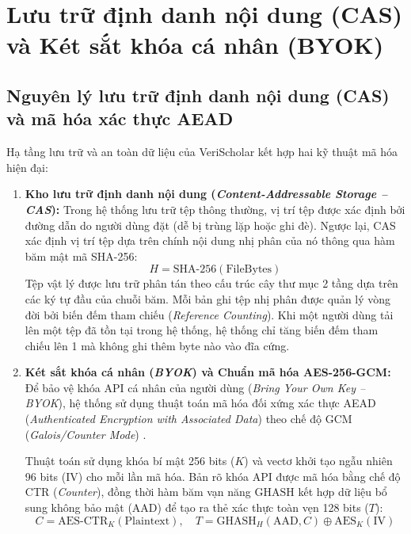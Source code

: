 \section{Lưu trữ định danh nội dung (CAS) và Két sắt khóa cá nhân (BYOK)}
\label{sec:cas_byok}

\subsection{Nguyên lý lưu trữ định danh nội dung (CAS) và mã hóa xác thực AEAD}
\label{subsec:nguyen_ly_cas_byok}
Hạ tầng lưu trữ và an toàn dữ liệu của VeriScholar kết hợp hai kỹ thuật mã hóa hiện đại:

\begin{enumerate}[label=\textbf{(\arabic*)}]
    \item \textbf{Kho lưu trữ định danh nội dung (\textit{Content-Addressable Storage -- CAS}):}
    Trong hệ thống lưu trữ tệp thông thường, vị trí tệp được xác định bởi đường dẫn do người dùng đặt (dễ bị trùng lặp hoặc ghi đè). Ngược lại, CAS xác định vị trí tệp dựa trên chính nội dung nhị phân của nó thông qua hàm băm mật mã SHA-256:
    \begin{equation}
    \label{eq:sha256}
    H = \text{SHA-256}(\text{FileBytes})
    \end{equation}
    Tệp vật lý được lưu trữ phân tán theo cấu trúc cây thư mục 2 tầng dựa trên các ký tự đầu của chuỗi băm. Mỗi bản ghi tệp nhị phân được quản lý vòng đời bởi biến đếm tham chiếu (\textit{Reference Counting}). Khi một người dùng tải lên một tệp đã tồn tại trong hệ thống, hệ thống chỉ tăng biến đếm tham chiếu lên 1 mà không ghi thêm byte nào vào đĩa cứng.

    \item \textbf{Két sắt khóa cá nhân (\textit{BYOK}) và Chuẩn mã hóa AES-256-GCM:}
    Để bảo vệ khóa API cá nhân của người dùng (\textit{Bring Your Own Key -- BYOK}), hệ thống sử dụng thuật toán mã hóa đối xứng xác thực AEAD (\textit{Authenticated Encryption with Associated Data}) theo chế độ GCM (\textit{Galois/Counter Mode}) \cite{nguyendinhthuc2001}. 

    Thuật toán sử dụng khóa bí mật 256 bits ($K$) và vectơ khởi tạo ngẫu nhiên 96 bits ($\text{IV}$) cho mỗi lần mã hóa. Bản rõ khóa API được mã hóa bằng chế độ CTR (\textit{Counter}), đồng thời hàm băm vạn năng $\text{GHASH}$ kết hợp dữ liệu bổ sung không bảo mật ($\text{AAD}$) để tạo ra thẻ xác thực toàn vẹn 128 bits ($T$):
    \begin{equation}
    \label{eq:aes_gcm}
    C = \text{AES-CTR}_K(\text{Plaintext}), \quad T = \text{GHASH}_H(\text{AAD}, C) \oplus \text{AES}_K(\text{IV})
    \end{equation}
\end{enumerate}

